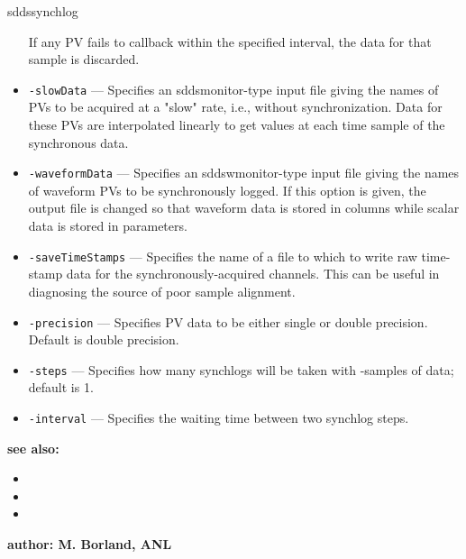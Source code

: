 \begin{sddsprog}{sddssynchlog}
\begin{itemize}
                If any PV fails to callback within the specified interval, the data for
                that sample is discarded.
        \item {\tt -slowData} --- Specifies an sddsmonitor-type input file giving the names of PVs to be
                acquired at a "slow" rate, i.e., without synchronization.  Data for these PVs
                are interpolated linearly to get values at each time sample of the synchronous
                data.
        \item {\tt -waveformData} --- Specifies an sddswmonitor-type input file giving the names of waveform PVs to
                be synchronously logged.  If this option is given, the output file is changed
                so that waveform data is stored in columns while scalar data is stored in
                parameters.
        \item {\tt -saveTimeStamps} --- Specifies the name of a file to which to write raw time-stamp data for the
                synchronously-acquired channels.  This can be useful in diagnosing the source
                of poor sample alignment.
        \item {\tt -precision} --- Specifies PV data to be either single or double precision.  Default is double precision.
        \item {\tt -steps} --- Specifies how many synchlogs will be taken with -samples of data; default is 1.
        \item {\tt -interval} --- Specifies the waiting time between two synchlog steps.
    \end{itemize}

\item {\bf see also:}
    \begin{itemize}
    \item {}
    \item {}
    \item {}
    \end{itemize}
\item {\bf author: M. Borland, ANL} 
\end{sddsprog}
